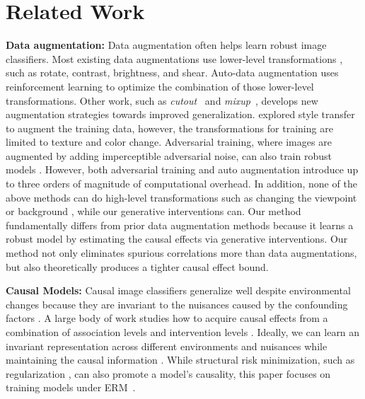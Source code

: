 \documentclass[final]{cvpr}
\begin{document}
%
 

\section{Related Work}




\textbf{Data augmentation:} Data augmentation often helps learn robust image classifiers. Most existing data augmentations use lower-level transformations \cite{AlexNet, tian2020rethinking}, such as rotate, contrast, brightness, and shear. Auto-data augmentation \cite{cubuk2018autoaugment, zhang2019adversarialautoaug} uses reinforcement learning to optimize the combination of those lower-level transformations. Other work, such as \emph{cutout}~\cite{maskout} and \emph{mixup}~\cite{zhang2017mixup}, develops new augmentation strategies towards improved generalization.
\cite{perez2017effectivenessaug, cyclegan-aug, imagenetbiased} explored style transfer to augment the training data, however, the transformations for training are limited to texture and color change. Adversarial training, where images are augmented by adding imperceptible adversarial noise, can also train robust models \cite{xie2019adversarial}. However, both adversarial training \cite{xie2019adversarial} and auto augmentation \cite{cubuk2018autoaugment, zhang2019adversarialautoaug} introduce up to three orders of magnitude of computational overhead. In addition, none of the above methods can do high-level transformations such as changing the viewpoint or background \cite{Objectnet}, while our generative interventions can. 
Our method fundamentally differs from prior data augmentation methods because it learns a robust model by estimating the causal effects via generative interventions. Our method not only eliminates spurious correlations more than data augmentations, but also theoretically produces a tighter causal effect bound. 






\textbf{Causal Models:} Causal image classifiers generalize well despite environmental changes because they are invariant to the nuisances caused by the confounding factors \cite{arjovsky2019invariant}. A large body of work studies how to acquire causal effects from a combination of association levels and intervention levels \cite{causaladaptation, causalfeature, nair2019causal}. Ideally, we can learn an invariant representation across different environments and nuisances \cite{arjovsky2019invariant, CIinvariant} while maintaining the causal information \cite{aless2017emergence}. While structural risk minimization, such as regularization \cite{janzing2019causalregularization}, can also promote a model's causality, this paper focuses on training models under ERM~\cite{ERM}. 
\end{document}
